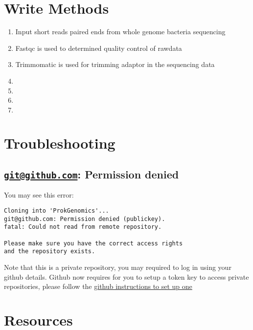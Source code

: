 \documentclass[
]{book}
\providecommand{\tightlist}{%
  \setlength{\itemsep}{0pt}\setlength{\parskip}{0pt}}
\begin{document}
\hypertarget{write-methods}{%
\chapter{Write Methods}\label{write-methods}}

\begin{enumerate}
\def\labelenumi{\arabic{enumi}.}
\tightlist
\item
  Input short reads paired ends from whole genome bacteria sequencing
\item
  Fastqc is used to determined quality control of rawdata
\item
  Trimmomatic is used for trimming adaptor in the sequencing data
\item
\item
\item
\item
\end{enumerate}

\hypertarget{troubleshooting}{%
\chapter{Troubleshooting}\label{troubleshooting}}

\hypertarget{gitgithub.com-permission-denied}{%
\section{\texorpdfstring{\href{mailto:git@github.com}{\nolinkurl{git@github.com}}: Permission denied}{git@github.com: Permission denied}}\label{gitgithub.com-permission-denied}}

You may see this error:

\begin{verbatim}
Cloning into 'ProkGenomics'...
git@github.com: Permission denied (publickey).
fatal: Could not read from remote repository.

Please make sure you have the correct access rights
and the repository exists.
\end{verbatim}

Note that this is a private repository, you may required to log in using your github details. Github now requires for you to setup a token key to access private repositories, please follow the \href{https://docs.github.com/en/authentication/keeping-your-account-and-data-secure/managing-your-personal-access-tokens}{github instructions to set up one}

\hypertarget{resources}{%
\chapter{Resources}\label{resources}}
\end{document}
